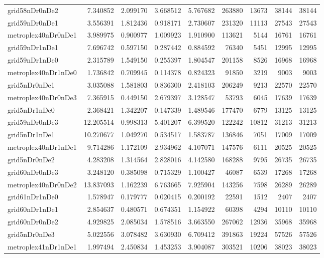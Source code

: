 \begin{longtable}{|l|r|r|r|r|r|r|r|r|}
grid58nDr0nDe2 & 7.340852 & 2.099170 & 3.668512 & 5.767682 & 263880 & 13673 & 38144 & 38144 \\
grid59nDr0nDe1 & 3.556391 & 1.812436 & 0.918171 & 2.730607 & 231320 & 11113 & 27543 & 27543 \\
metroplex40nDr0nDe1 & 3.989975 & 0.900977 & 1.009923 & 1.910900 & 113621 & 5144 & 16761 & 16761 \\
grid59nDr1nDe1 & 7.696742 & 0.597150 & 0.287442 & 0.884592 & 76340 & 5451 & 12995 & 12995 \\
grid59nDr1nDe0 & 2.315789 & 1.549150 & 0.255397 & 1.804547 & 201158 & 8526 & 16968 & 16968 \\
metroplex40nDr1nDe0 & 1.736842 & 0.709945 & 0.114378 & 0.824323 & 91850 & 3219 & 9003 & 9003 \\
grid5nDr0nDe1 & 3.035088 & 1.581803 & 0.836300 & 2.418103 & 206249 & 9213 & 22570 & 22570 \\
metroplex40nDr0nDe3 & 7.365915 & 0.449150 & 2.679397 & 3.128547 & 53793 & 6045 & 17639 & 17639 \\
grid5nDr1nDe0 & 2.368421 & 1.342207 & 0.147339 & 1.489546 & 177470 & 6779 & 13125 & 13125 \\
grid59nDr0nDe3 & 12.205514 & 0.998313 & 5.401207 & 6.399520 & 122242 & 10812 & 31213 & 31213 \\
grid5nDr1nDe1 & 10.270677 & 1.049270 & 0.534517 & 1.583787 & 136846 & 7051 & 17009 & 17009 \\
metroplex40nDr1nDe1 & 9.714286 & 1.172109 & 2.934962 & 4.107071 & 147576 & 6111 & 20525 & 20525 \\
grid5nDr0nDe2 & 4.283208 & 1.314564 & 2.828016 & 4.142580 & 168288 & 9795 & 26735 & 26735 \\
grid60nDr0nDe3 & 3.248120 & 0.385098 & 0.715329 & 1.100427 & 46087 & 6539 & 17268 & 17268 \\
metroplex40nDr0nDe2 & 13.837093 & 1.162239 & 6.763665 & 7.925904 & 143256 & 7598 & 26289 & 26289 \\
grid61nDr1nDe0 & 1.578947 & 0.179777 & 0.020415 & 0.200192 & 22591 & 1512 & 2407 & 2407 \\
grid60nDr1nDe1 & 2.854637 & 0.480571 & 0.674351 & 1.154922 & 60398 & 4294 & 10110 & 10110 \\
grid60nDr0nDe2 & 4.929825 & 2.085034 & 1.578516 & 3.663550 & 267062 & 12936 & 35968 & 35968 \\
grid5nDr0nDe3 & 5.022556 & 3.078482 & 3.630930 & 6.709412 & 391863 & 19224 & 57526 & 57526 \\
metroplex41nDr1nDe1 & 1.997494 & 2.450834 & 1.453253 & 3.904087 & 303521 & 10206 & 38023 & 38023 \\

\end{longtable}
